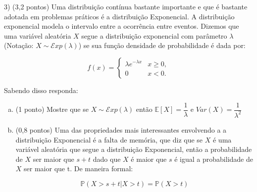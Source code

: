 \documentclass[12pt]{article}
\begin{document}
3) (3,2 pontos) Uma distribuição contínua bastante importante e que é bastante adotada em problemas práticos é a distribuição Exponencial. A distribuição exponencial 
modela o intervalo entre a ocorrência entre eventos. Dizemos que uma variável aleatória $X$ segue a distribuição exponencial com parâmetro $\lambda$(Notação: $X \sim \mathcal{E}xp(\lambda)$) se sua função densidade de probabilidade é dada por:

$$f(x) = \begin{cases}
    \lambda e^{-\lambda x} & x\geq 0,\\
    0 & x < 0.
\end{cases}$$

Sabendo disso responda:

\begin{enumerate}[a)]
    \item (1 ponto) Mostre que se $X \sim \mathcal{E}xp(\lambda)$ então $\mathbb{E}[X] = \dfrac{1}{\lambda}$ e $Var(X) = \dfrac{1}{\lambda^2}$
    \item (0,8 pontos) Uma das propriedades mais interessantes envolvendo a a distribuição Exponencial é a falta de memória, que diz que se $X$ é uma 
        variável aleatória que segue a distribuição Exponencial, então a probabilidade de $X$ ser maior que $s+t$ dado que $X$ é maior que $s$ é 
        igual a probabilidade de $X$ ser maior que t. De maneira formal:
        
        $$\mathds{P}(X>s+t|X>t) = \mathds{P}(X>t)$$


\end{enumerate}
\end{document}
